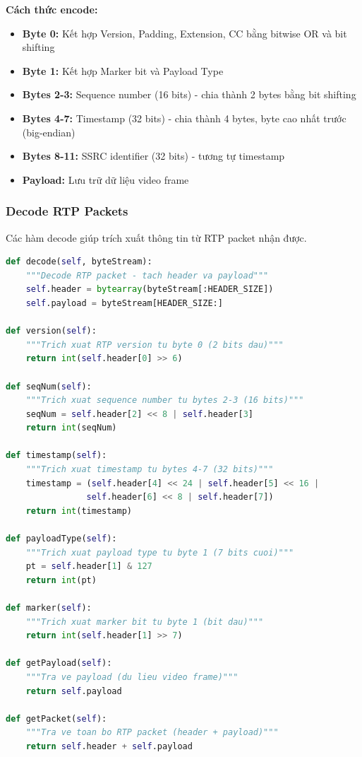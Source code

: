 \documentclass[a4paper,12pt]{article}
\begin{document}
\textbf{Cách thức encode:}
\begin{itemize}
    \item \textbf{Byte 0:} Kết hợp Version, Padding, Extension, CC bằng bitwise OR và bit shifting
    \item \textbf{Byte 1:} Kết hợp Marker bit và Payload Type
    \item \textbf{Bytes 2-3:} Sequence number (16 bits) - chia thành 2 bytes bằng bit shifting
    \item \textbf{Bytes 4-7:} Timestamp (32 bits) - chia thành 4 bytes, byte cao nhất trước (big-endian)
    \item \textbf{Bytes 8-11:} SSRC identifier (32 bits) - tương tự timestamp
    \item \textbf{Payload:} Lưu trữ dữ liệu video frame
\end{itemize}

\subsubsection{Decode RTP Packets}

Các hàm decode giúp trích xuất thông tin từ RTP packet nhận được.

\begin{lstlisting}[language=Python, caption={RTP Decode Methods}]
def decode(self, byteStream):
    """Decode RTP packet - tach header va payload"""
    self.header = bytearray(byteStream[:HEADER_SIZE])
    self.payload = byteStream[HEADER_SIZE:]

def version(self):
    """Trich xuat RTP version tu byte 0 (2 bits dau)"""
    return int(self.header[0] >> 6)

def seqNum(self):
    """Trich xuat sequence number tu bytes 2-3 (16 bits)"""
    seqNum = self.header[2] << 8 | self.header[3]
    return int(seqNum)

def timestamp(self):
    """Trich xuat timestamp tu bytes 4-7 (32 bits)"""
    timestamp = (self.header[4] << 24 | self.header[5] << 16 |
                self.header[6] << 8 | self.header[7])
    return int(timestamp)

def payloadType(self):
    """Trich xuat payload type tu byte 1 (7 bits cuoi)"""
    pt = self.header[1] & 127
    return int(pt)

def marker(self):
    """Trich xuat marker bit tu byte 1 (bit dau)"""
    return int(self.header[1] >> 7)

def getPayload(self):
    """Tra ve payload (du lieu video frame)"""
    return self.payload

def getPacket(self):
    """Tra ve toan bo RTP packet (header + payload)"""
    return self.header + self.payload
\end{lstlisting}
\end{document}
